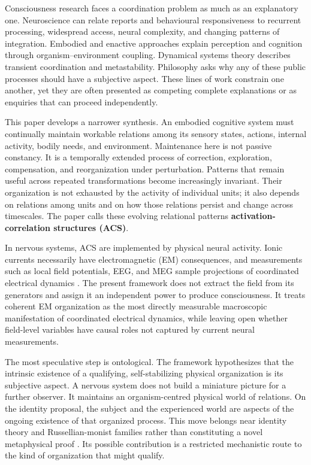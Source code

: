 \documentclass[
  11pt,
  a4paper,
]{article}
\begin{document}
Consciousness research faces a coordination problem as much as an
explanatory one. Neuroscience can relate reports and behavioural
responsiveness to recurrent processing, widespread access, neural
complexity, and changing patterns of integration. Embodied and enactive
approaches explain perception and cognition through
organism--environment coupling. Dynamical systems theory describes
transient coordination and metastability. Philosophy asks why any of
these public processes should have a subjective aspect. These lines of
work constrain one another, yet they are often presented as competing
complete explanations or as enquiries that can proceed independently.

This paper develops a narrower synthesis. An embodied cognitive system
must continually maintain workable relations among its sensory states,
actions, internal activity, bodily needs, and environment. Maintenance
here is not passive constancy. It is a temporally extended process of
correction, exploration, compensation, and reorganization under
perturbation. Patterns that remain useful across repeated
transformations become increasingly invariant. Their organization is not
exhausted by the activity of individual units; it also depends on
relations among units and on how those relations persist and change
across timescales. The paper calls these evolving relational patterns
\textbf{activation-correlation structures (ACS)}.

In nervous systems, ACS are implemented by physical neural activity.
Ionic currents necessarily have electromagnetic (EM) consequences, and
measurements such as local field potentials, EEG, and MEG sample
projections of coordinated electrical dynamics \citep{nunez2006}. The
present framework does not extract the field from its generators and
assign it an independent power to produce consciousness. It treats
coherent EM organization as the most directly measurable macroscopic
manifestation of coordinated electrical dynamics, while leaving open
whether field-level variables have causal roles not captured by current
neural measurements.

The most speculative step is ontological. The framework hypothesizes
that the intrinsic existence of a qualifying, self-stabilizing physical
organization is its subjective aspect. A nervous system does not build a
miniature picture for a further observer. It maintains an
organism-centred physical world of relations. On the identity proposal,
the subject and the experienced world are aspects of the ongoing
existence of that organized process. This move belongs near identity
theory and Russellian-monist families rather than constituting a novel
metaphysical proof \citep{smart1959, strawson2006, chalmers2013}. Its
possible contribution is a restricted mechanistic route to the kind of
organization that might qualify.
\end{document}
